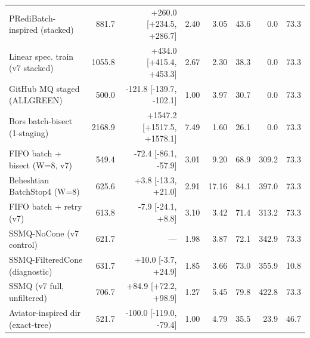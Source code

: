 \begin{table}[t]
\begin{tabular}{lrrrrrrr}
PRediBatch-inspired (stacked) & 881.7 & +260.0 [+234.5, +286.7] & 2.40 & 3.05 & 43.6 & 0.0 & 73.3 \\
Linear spec. train (v7 stacked) & 1055.8 & +434.0 [+415.4, +453.3] & 2.67 & 2.30 & 38.3 & 0.0 & 73.3 \\
GitHub MQ staged (ALLGREEN) & 500.0 & -121.8 [-139.7, -102.1] & 1.00 & 3.97 & 30.7 & 0.0 & 73.3 \\
Bors batch-bisect (1-staging) & 2168.9 & +1547.2 [+1517.5, +1578.1] & 7.49 & 1.60 & 26.1 & 0.0 & 73.3 \\
FIFO batch + bisect (W=8, v7) & 549.4 & -72.4 [-86.1, -57.9] & 3.01 & 9.20 & 68.9 & 309.2 & 73.3 \\
Beheshtian BatchStop4 (W=8) & 625.6 & +3.8 [-13.3, +21.0] & 2.91 & 17.16 & 84.1 & 397.0 & 73.3 \\
FIFO batch + retry (v7) & 613.8 & -7.9 [-24.1, +8.8] & 3.10 & 3.42 & 71.4 & 313.2 & 73.3 \\
SSMQ-NoCone (v7 control) & 621.7 & --- & 1.98 & 3.87 & 72.1 & 342.9 & 73.3 \\
SSMQ-FilteredCone (diagnostic) & 631.7 & +10.0 [-3.7, +24.9] & 1.85 & 3.66 & 73.0 & 355.9 & 10.8 \\
SSMQ (v7 full, unfiltered) & 706.7 & +84.9 [+72.2, +98.9] & 1.27 & 5.45 & 79.8 & 422.8 & 73.3 \\
Aviator-inspired dir (exact-tree) & 521.7 & -100.0 [-119.0, -79.4] & 1.00 & 4.79 & 35.5 & 23.9 & 46.7 \\
\bottomrule\end{tabular}\end{table}

